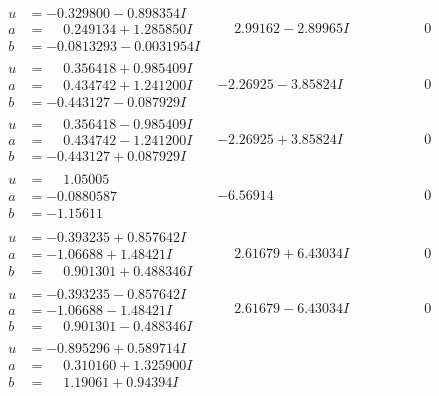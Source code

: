 \documentclass[1p]{elsarticle_modified}
\theoremstyle{definition}
\begin{document}
$$\begin{array}{c|c|c}
\begin{aligned}
u &= -0.329800 - 0.898354 I \\
a &= \phantom{-}0.249134 + 1.285850 I \\
b &= -0.0813293 - 0.0031954 I\end{aligned}
 & \phantom{-}2.99162 - 2.89965 I & \phantom{-0.000000 } 0 \\ \hline\begin{aligned}
u &= \phantom{-}0.356418 + 0.985409 I \\
a &= \phantom{-}0.434742 + 1.241200 I \\
b &= -0.443127 - 0.087929 I\end{aligned}
 & -2.26925 - 3.85824 I & \phantom{-0.000000 } 0 \\ \hline\begin{aligned}
u &= \phantom{-}0.356418 - 0.985409 I \\
a &= \phantom{-}0.434742 - 1.241200 I \\
b &= -0.443127 + 0.087929 I\end{aligned}
 & -2.26925 + 3.85824 I & \phantom{-0.000000 } 0 \\ \hline\begin{aligned}
u &= \phantom{-}1.05005\phantom{ +0.000000I} \\
a &= -0.0880587\phantom{ +0.000000I} \\
b &= -1.15611\phantom{ +0.000000I}\end{aligned}
 & -6.56914\phantom{ +0.000000I} & \phantom{-0.000000 } 0 \\ \hline\begin{aligned}
u &= -0.393235 + 0.857642 I \\
a &= -1.06688 + 1.48421 I \\
b &= \phantom{-}0.901301 + 0.488346 I\end{aligned}
 & \phantom{-}2.61679 + 6.43034 I & \phantom{-0.000000 } 0 \\ \hline\begin{aligned}
u &= -0.393235 - 0.857642 I \\
a &= -1.06688 - 1.48421 I \\
b &= \phantom{-}0.901301 - 0.488346 I\end{aligned}
 & \phantom{-}2.61679 - 6.43034 I & \phantom{-0.000000 } 0 \\ \hline\begin{aligned}
u &= -0.895296 + 0.589714 I \\
a &= \phantom{-}0.310160 + 1.325900 I \\
b &= \phantom{-}1.19061 + 0.94394 I\end{aligned}

\end{array}$$
\end{document}
